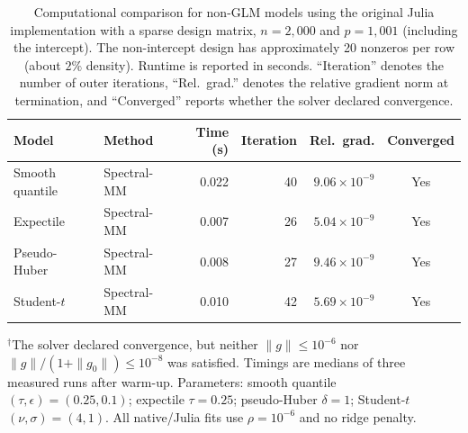 \begin{table}[htbp]
\centering
\small
\setlength{\tabcolsep}{4pt}
\caption{
Computational comparison for non-GLM models using the original Julia implementation with a sparse design matrix,
$n=2{,}000$ and $p=1{,}001$ (including the intercept).
The non-intercept design has approximately 20 nonzeros per row (about $2\%$ density).
Runtime is reported in seconds. ``Iteration\textquotedblright{} denotes the number of outer iterations,
``Rel.\ grad.\textquotedblright{} denotes the relative gradient norm at termination, and
``Converged\textquotedblright{} reports whether the solver declared convergence.}
\label{tab:julia-nonglm-comparison-sparse}
\begin{tabular}{llrrrc}
\toprule
Model & Method & Time (s) & Iteration & Rel.\ grad. & Converged \\
\midrule

Smooth quantile
& Spectral-MM & 0.022 & 40 & $9.06\times10^{-9}$ & Yes \\
\midrule

Expectile
& Spectral-MM & 0.007 & 26 & $5.04\times10^{-9}$ & Yes \\
\midrule

Pseudo-Huber
& Spectral-MM & 0.008 & 27 & $9.46\times10^{-9}$ & Yes \\
\midrule

Student-$t$
& Spectral-MM & 0.010 & 42 & $5.69\times10^{-9}$ & Yes \\

\bottomrule
\end{tabular}
\par\smallskip
\begin{minipage}{\linewidth}
\footnotesize
$^{\dagger}$The solver declared convergence, but neither $\|g\|\leq 10^{-6}$ nor
$\|g\|/(1+\|g_0\|)\leq 10^{-8}$ was satisfied.
Timings are medians of three measured runs after warm-up.
Parameters: smooth quantile $(\tau,\epsilon)=(0.25,0.1)$; expectile $\tau=0.25$;
pseudo-Huber $\delta=1$; Student-$t$ $(\nu,\sigma)=(4,1)$.
All native/Julia fits use $\rho=10^{-6}$ and no ridge penalty.
\end{minipage}
\end{table}

